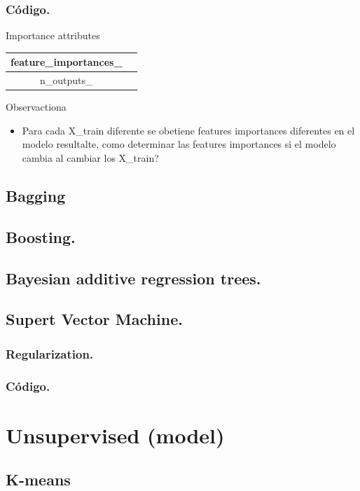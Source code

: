 \documentclass[12pt, a4paper]{book}
\begin{document}
\section{Código.}
Importance attributes
\begin{table}[H]
	\centering
	\begin{tabular}{|c|c|}
		\hline
		feature\_importances\_&\\
		\hline 
		n\_outputs\_&\\
		\hline 
	\end{tabular}
\end{table}

Observactiona
\begin{itemize}
	\item  Para cada X\_train diferente se obetiene features importances diferentes en el modelo resultalte, como determinar las features importances si el modelo cambia al cambiar los X\_train?
\end{itemize}
\chapter{Bagging}
\chapter{Boosting.}
\chapter{Bayesian additive regression trees.}



\chapter{Supert Vector Machine.}
\section{Regularization.}
\section{Código.}

\part{Unsupervised (model)}
\chapter{K-means}
\end{document}
